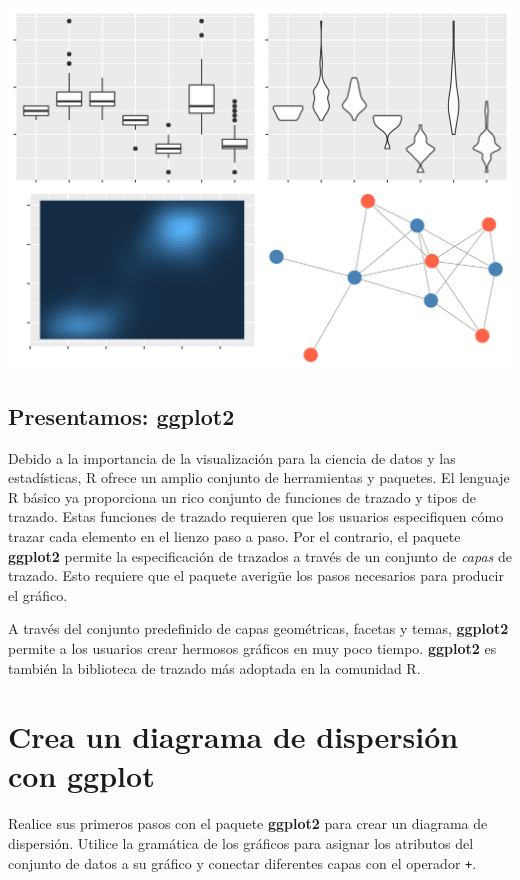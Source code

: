 \documentclass[
]{book}
\begin{document}
\includegraphics{img/otr.png}

\hypertarget{presentamos-ggplot2}{%
\subsection{Presentamos: ggplot2}\label{presentamos-ggplot2}}

Debido a la importancia de la visualización para la ciencia de datos y las estadísticas, R ofrece un amplio conjunto de herramientas y paquetes. El lenguaje R básico ya proporciona un rico conjunto de funciones de trazado y tipos de trazado. Estas funciones de trazado requieren que los usuarios especifiquen cómo trazar cada elemento en el lienzo paso a paso. Por el contrario, el paquete \textbf{ggplot2} permite la especificación de trazados a través de un conjunto de \emph{capas} de trazado. Esto requiere que el paquete averigüe los pasos necesarios para producir el gráfico.

A través del conjunto predefinido de capas geométricas, facetas y temas, \textbf{ggplot2} permite a los usuarios crear hermosos gráficos en muy poco tiempo. \textbf{ggplot2} es también la biblioteca de trazado más adoptada en la comunidad R.

\hypertarget{crea-un-diagrama-de-dispersiuxf3n-con-ggplot}{%
\section{Crea un diagrama de dispersión con ggplot}\label{crea-un-diagrama-de-dispersiuxf3n-con-ggplot}}

Realice sus primeros pasos con el paquete \textbf{ggplot2} para crear un diagrama de dispersión. Utilice la gramática de los gráficos para asignar los atributos del conjunto de datos a su gráfico y conectar diferentes capas con el operador \texttt{+}.
\end{document}
